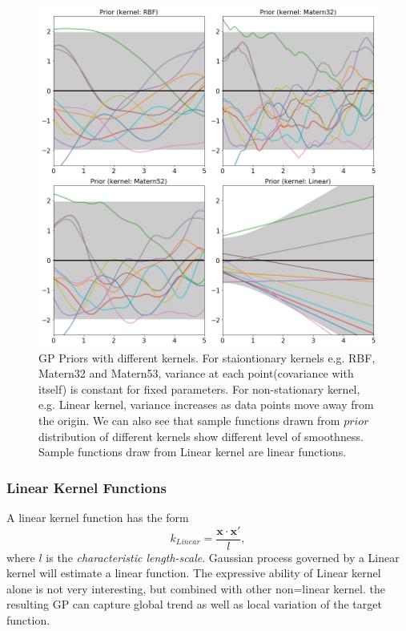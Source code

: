 \documentclass[11pt,a4paper]{article}
\theoremstyle{definition}
\numberwithin{equation}{section}
\let\vec\mathbf
\begin{document}
	\begin{figure}[t!]
		\centering
		\includegraphics[width=.9\linewidth]{prior_diff_kernels.png}
		\caption{GP Priors with different kernels. For staiontionary kernels e.g. RBF, Matern32 and Matern53, variance at each point(covariance with itself) is constant for fixed parameters. For non-stationary kernel, e.g. Linear kernel, variance increases as data points move away from the origin. We can also see that sample functions drawn from $prior$ distribution of different kernels show different level of smoothness. Sample functions draw from Linear kernel are linear functions.}
		\label{fig:gp_diff_kernels}
	\end{figure}
	
	\subsubsection*{Linear Kernel Functions}
	A linear kernel function has the form
	\begin{equation}
	k_{Linear} = \frac{\vec x \cdot \vec x'}{l},
	\end{equation}
	where $l$ is the \textit{characteristic length-scale}. Gaussian process governed by a Linear kernel will estimate a linear function. The expressive ability of Linear kernel alone is not very interesting, but combined with other non=linear kernel. the resulting GP can capture global trend as well as local variation of the target function. 
	
\end{document}
